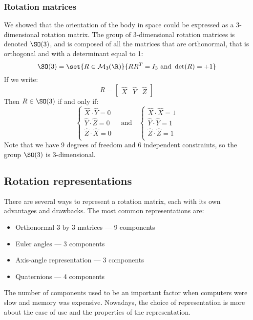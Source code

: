 \subsubsection{Rotation matrices}
We showed that the orientation of the body in space could be expressed as a 3-dimensional rotation matrix. The group of 3-dimensional rotation matrices is denoted $\SO(3)$, and is composed of all the matrices that are orthonormal, that is orthogonal and with a determinant equal to 1:
\begin{equation}
    \SO(3) = \set{R\in\mathcal{M}_{3}(\R)}{RR^T=I_3 \text{ and } \det(R) = +1}
\end{equation}
If we write:
\begin{equation*}
    R = \begin{bmatrix}
        \hat{X} & \hat{Y} & \hat{Z}
    \end{bmatrix}
\end{equation*}
Then $R\in\SO(3)$ if and only if:
\begin{equation*}
    \begin{cases}
        \hat{X}\cdot\hat{Y} = 0 \\
        \hat{Y}\cdot\hat{Z} = 0 \\
        \hat{Z}\cdot\hat{X} = 0 \\
    \end{cases}
    \quad\text{and}\quad
    \begin{cases}
        \hat{X}\cdot\hat{X} = 1 \\
        \hat{Y}\cdot\hat{Y} = 1 \\
        \hat{Z}\cdot\hat{Z} = 1 \\
    \end{cases}
\end{equation*}
Note that we have 9 degrees of freedom and 6 independent constraints, so the group $\SO(3)$ is 3-dimensional.

\subsection{Rotation representations}
There are several ways to represent a rotation matrix, each with its own advantages and drawbacks. The most common representations are:
\begin{itemize}
    \item Orthonormal 3 by 3 matrices --- 9 components
    \item Euler angles --- 3 components
    \item Axis-angle representation --- 3 components
    \item Quaternions --- 4 components
\end{itemize}
The number of components used to be an important factor when computers were slow and memory was expensive. Nowadays, the choice of representation is more about the ease of use and the properties of the representation.

